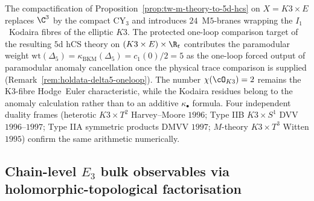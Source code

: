 \begin{remark}
\label{rem:tw-m-theory-k3e-paramodular}
The compactification of Proposition~\ref{prop:tw-m-theory-to-5d-hcs} on
$X = K3 \times E$ replaces $\C^3$ by the compact CY$_3$ and introduces
$24$~M$5$-branes wrapping the $I_1$~Kodaira fibres of the elliptic
$K3$. The protected one-loop comparison target of the resulting $5$d
hCS theory on $(K3 \times E) \times \R_t$ contributes the paramodular weight
$\mathrm{wt}(\Delta_5)=\kappa_{\mathrm{BKM}}(\Delta_5)=c_1(0)/2=5$ as the one-loop forced output of
paramodular anomaly cancellation once the physical trace comparison is supplied
(Remark~\ref{rem:holdata-delta5-oneloop}). The number
$\chi(\cO_{K3}) = 2$ remains the K3-fibre Hodge~Euler characteristic,
while the Kodaira residues belong to the anomaly calculation rather
than to an additive $\kappa_\bullet$ formula. Four independent duality frames
(heterotic $K3 \times T^2$ Harvey--Moore $1996$; Type IIB $K3 \times
S^1$ DVV $1996$--$1997$; Type IIA symmetric products DMVV $1997$;
$M$-theory $K3 \times T^3$ Witten $1995$) confirm the same arithmetic
numerically.
\end{remark}

\subsection{Chain-level \texorpdfstring{$E_3$}{E-3} bulk observables via holomorphic-topological factorisation}
\label{subsec:E3-chain-level-HT-factorisation}

